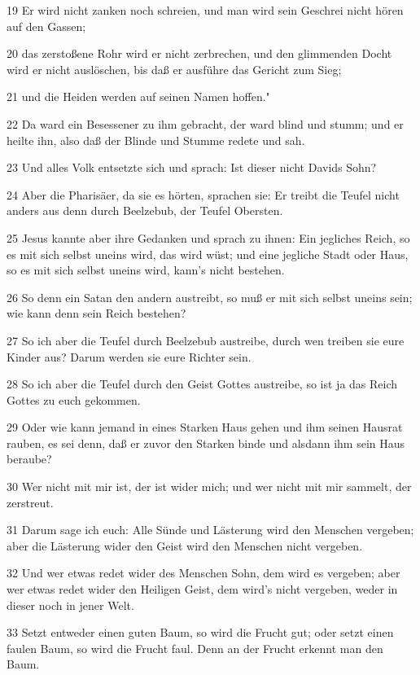 \par 19 Er wird nicht zanken noch schreien, und man wird sein Geschrei nicht hören auf den Gassen;
\par 20 das zerstoßene Rohr wird er nicht zerbrechen, und den glimmenden Docht wird er nicht auslöschen, bis daß er ausführe das Gericht zum Sieg;
\par 21 und die Heiden werden auf seinen Namen hoffen."
\par 22 Da ward ein Besessener zu ihm gebracht, der ward blind und stumm; und er heilte ihn, also daß der Blinde und Stumme redete und sah.
\par 23 Und alles Volk entsetzte sich und sprach: Ist dieser nicht Davids Sohn?
\par 24 Aber die Pharisäer, da sie es hörten, sprachen sie: Er treibt die Teufel nicht anders aus denn durch Beelzebub, der Teufel Obersten.
\par 25 Jesus kannte aber ihre Gedanken und sprach zu ihnen: Ein jegliches Reich, so es mit sich selbst uneins wird, das wird wüst; und eine jegliche Stadt oder Haus, so es mit sich selbst uneins wird, kann's nicht bestehen.
\par 26 So denn ein Satan den andern austreibt, so muß er mit sich selbst uneins sein; wie kann denn sein Reich bestehen?
\par 27 So ich aber die Teufel durch Beelzebub austreibe, durch wen treiben sie eure Kinder aus? Darum werden sie eure Richter sein.
\par 28 So ich aber die Teufel durch den Geist Gottes austreibe, so ist ja das Reich Gottes zu euch gekommen.
\par 29 Oder wie kann jemand in eines Starken Haus gehen und ihm seinen Hausrat rauben, es sei denn, daß er zuvor den Starken binde und alsdann ihm sein Haus beraube?
\par 30 Wer nicht mit mir ist, der ist wider mich; und wer nicht mit mir sammelt, der zerstreut.
\par 31 Darum sage ich euch: Alle Sünde und Lästerung wird den Menschen vergeben; aber die Lästerung wider den Geist wird den Menschen nicht vergeben.
\par 32 Und wer etwas redet wider des Menschen Sohn, dem wird es vergeben; aber wer etwas redet wider den Heiligen Geist, dem wird's nicht vergeben, weder in dieser noch in jener Welt.
\par 33 Setzt entweder einen guten Baum, so wird die Frucht gut; oder setzt einen faulen Baum, so wird die Frucht faul. Denn an der Frucht erkennt man den Baum.
